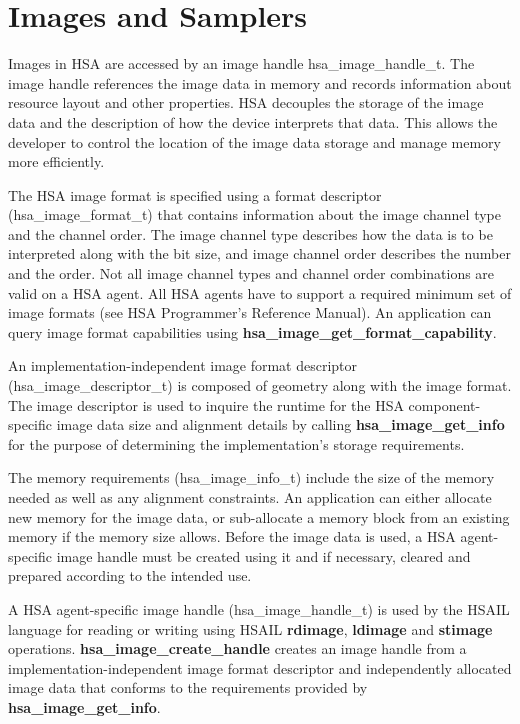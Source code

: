 \documentclass[final]{book}
\newcommand{\reffun}[1]{\textbf{#1}}
\newcommand{\reftyp}[1]{#1}
\newcommand{\refhsl}[1]{\reffun{#1}}
\begin{document}
\section{Images and Samplers}
\label{images} \hypertarget{images}{}

Images in HSA are accessed by an image handle \reftyp{hsa_image_handle_t}. The
image handle references the image data in memory and records information about
resource layout and other properties. HSA decouples the storage of the image
data and the description of how the device interprets that data. This allows the
developer to control the location of the image data storage and manage memory
more efficiently.

The HSA image format is specified using a format descriptor
(\reftyp{hsa_image_format_t}) that contains information about the image channel
type and the channel order. The image channel type describes how the data is to
be interpreted along with the bit size, and image channel order describes the
number and the order. Not all image channel types and channel order combinations
are valid on a HSA agent. All HSA agents have to support a required minimum set
of image formats (see HSA Programmer's Reference Manual). An application can
query image format capabilities using \reffun{hsa_image_get_format_capability}.

An implementation-independent image format descriptor
(\reftyp{hsa_image_descriptor_t}) is composed of geometry along with the
image format. The image descriptor is used to inquire the runtime for the HSA
component-specific image data size and alignment details by calling
\reffun{hsa_image_get_info} for the purpose of determining the
implementation's storage requirements.

The memory requirements (\reftyp{hsa_image_info_t}) include the size of the
memory needed as well as any alignment constraints. An application can either
allocate new memory for the image data, or sub-allocate a memory block from an
existing memory if the memory size allows. Before the image data is used, a HSA
agent-specific image handle must be created using it and if necessary, cleared
and prepared according to the intended use.

A HSA agent-specific image handle (\reftyp{hsa_image_handle_t}) is used by the
HSAIL language for reading or writing using HSAIL \refhsl{rdimage},
\refhsl{ldimage} and \refhsl{stimage}
operations. \reffun{hsa_image_create_handle} creates an image handle from a
implementation-independent image format descriptor and independently allocated
image data that conforms to the requirements provided by
\reffun{hsa_image_get_info}.
\end{document}
